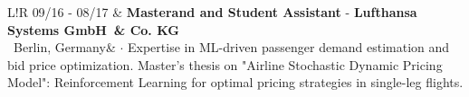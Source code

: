 \documentclass[a4paper, 12]{scrartcl}
\newcommand{\companyName}[1]{\textbf{\textcolor{secondaryColor}{#1}}}
\newcommand{\jobTitle}[1]{\textbf{#1}}
\newcommand{\fromBis}[2]{\scriptsize{#1 - #2}}
\newcommand{\cvLocation}[2]{\scriptsize{\ #1, #2}}
\newcommand{\spaceBetweenCvEntry}{\\[6pt]}
\newcommand{\sbt}{$\cdot$ }
\newcommand{\berlin}{\cvLocation{Berlin}{Germany}}
\newcommand{\gmbh}{GmbH}
\newcommand{\lsy}{Lufthansa Systems \gmbh \ \& Co. KG}
\newcommand\VRule{\color{lightGray}\vrule width 0.25pt}
\begin{document}
\begin{tabular}{L!{\VRule}R}
		\fromBis{09/16}{08/17} & \jobTitle{Masterand and Student Assistant} - \companyName{\lsy}\\ 
		\berlin & \sbt Expertise in ML-driven passenger demand estimation and bid price optimization. Master's thesis on "Airline Stochastic Dynamic Pricing Model": Reinforcement Learning for optimal pricing strategies in single-leg flights.

            \begin{comment}		
                \fromBis{04/2014}{09/2015} & \jobTitle{Student Assistant} - \companyName{Wintershall Erdgas Handelhaus GmbH \& Co. KG - BASF}\\
		      \footnotesize{Berlin, Germany} & Database management -- Logistics \\
		      &\\[-9pt]
		      & Gas Transport Optimization Tool: Managed, maintained databases. QA testing of new modules for productive use.\\
		
		
    		01/2012 - 02/2012& \jobTitle{Engineering Intern} - \companyName{Minera Esperanza S.A.}\\
    		\footnotesize{Santiago, Chile}&\\[-22pt]
    		& \sbt \ Analyzed procurement process and evaluated financial risk of prospective suppliers and contractors.\\[-12pt]
    		& \sbt \ Designed and developed new procurement assessment methodology: multivariate model of financial ratios, increasing flexibility without incurring in additional risk levels.
    		\spaceBetweenCvEntry
    		
    		06/2011 - 07/2011&\textbf{Intern}, Planning and Control Department - ABB S.A.\\
    		\footnotesize{Santiago, Chile}&\\[-12pt]
    		
    		& Monitored projects, developed periodic financial reports and collaborated closely with project managers from process automation division.\spaceBetweenCvEntry
    		01/2010 - 02/2010 & \textbf{Research Assistant} - Program of Studies and Research on Energy - \\ \footnotesize{Santiago, Chile}&\textsc{Universidad de Chile}\\
    		\\[-12pt]
    		& Contributed as assistant and co-researcher in the National Plan of Energetic Efficiency 2010 -- 20 for the Chilean government.\\
            \end{comment}
		
	\end{tabular}
	
\end{document}
